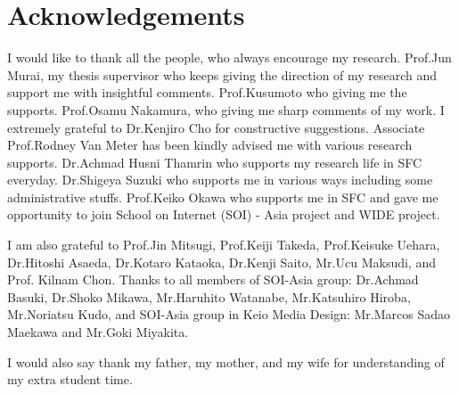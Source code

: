 
\chapter*{Acknowledgements}
I would like to thank all the people, who always encourage my research.
Prof.Jun Murai, my thesis supervisor who keeps giving the direction of my research and support me with insightful comments.
Prof.Kusumoto who giving me the supports.
Prof.Osamu Nakamura, who giving me sharp comments of my work.  
I extremely grateful to Dr.Kenjiro Cho for constructive suggestions.
Associate Prof.Rodney Van Meter has been kindly advised me with various research supports. 
Dr.Achmad Husni Thamrin who supports my research life in SFC everyday.
Dr.Shigeya Suzuki who supports me in various ways including some administrative stuffs. 
Prof.Keiko Okawa who supports me in SFC and gave me opportunity to join School on Internet (SOI) - Asia project and WIDE project.

I am also grateful to Prof.Jin Mitsugi, Prof.Keiji Takeda, Prof.Keisuke Uehara, Dr.Hitoshi Asaeda, Dr.Kotaro Kataoka, Dr.Kenji Saito, 
Mr.Ucu Maksudi, and Prof. Kilnam Chon.
Thanks to all members of SOI-Asia group: Dr.Achmad Basuki, Dr.Shoko Mikawa, Mr.Haruhito Watanabe, Mr.Katsuhiro Hiroba, Mr.Noriatsu Kudo, 
and SOI-Asia group in Keio Media Design: Mr.Marcos Sadao Maekawa and Mr.Goki Miyakita.

I would also say thank my father, my mother, and my wife for understanding of my extra student time. 





